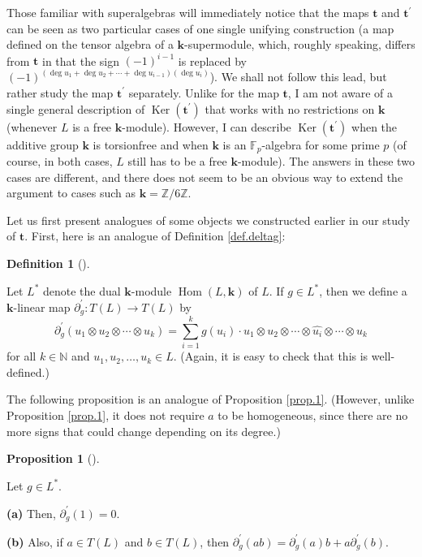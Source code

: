 \documentclass[numbers=enddot,12pt,final,onecolumn,notitlepage]{scrartcl}%
\theoremstyle{definition}
\newtheorem{prop}[theo]{Proposition}
\newenvironment{proposition}[1][]
{\begin{prop}[#1]\begin{leftbar}}
{\end{leftbar}\end{prop}}
\newtheorem{defi}[theo]{Definition}
\newenvironment{definition}[1][]
{\begin{defi}[#1]\begin{leftbar}}
{\end{leftbar}\end{defi}}
\let\sumnonlimits\sum
\renewcommand{\sum}{\sumnonlimits\limits}
\begin{document}
Those familiar with superalgebras will immediately notice that the maps
$\mathbf{t}$ and $\mathbf{t}^{\prime}$ can be seen as two particular cases of
one single unifying construction (a map defined on the tensor algebra of a
$\mathbf{k}$-supermodule, which, roughly speaking, differs from $\mathbf{t}$
in that the sign $\left(  -1\right)  ^{i-1}$ is replaced by $\left(
-1\right)  ^{\left(  \deg u_{1}+\deg u_{2}+\cdots+\deg u_{i-1}\right)  \left(
\deg u_{i}\right)  }$). We shall not follow this lead, but rather study the
map $\mathbf{t}^{\prime}$ separately. Unlike for the map $\mathbf{t}$, I am
not aware of a single general description of $\operatorname*{Ker}\left(
\mathbf{t}^{\prime}\right)  $ that works with no restrictions on $\mathbf{k}$
(whenever $L$ is a free $\mathbf{k}$-module). However, I can describe
$\operatorname*{Ker}\left(  \mathbf{t}^{\prime}\right)  $ when the additive
group $\mathbf{k}$ is torsionfree and when $\mathbf{k}$ is an $\mathbb{F}_{p}%
$-algebra for some prime $p$ (of course, in both cases, $L$ still has to be a
free $\mathbf{k}$-module). The answers in these two cases are different, and
there does not seem to be an obvious way to extend the argument to cases such
as $\mathbf{k}=\mathbb{Z}/6\mathbb{Z}$.

Let us first present analogues of some objects we constructed earlier in our
study of $\mathbf{t}$. First, here is an analogue of Definition
\ref{def.deltag}:

\begin{definition}
Let $L^{\ast}$ denote the dual $\mathbf{k}$-module $\operatorname*{Hom}\left(
L,\mathbf{k}\right)  $ of $L$. If $g\in L^{\ast}$, then we define a
$\mathbf{k}$-linear map $\partial_{g}^{\prime}:T\left(  L\right)  \rightarrow
T\left(  L\right)  $ by%
\[
\partial_{g}^{\prime}\left(  u_{1}\otimes u_{2}\otimes\cdots\otimes
u_{k}\right)  =\sum_{i=1}^{k}g\left(  u_{i}\right)  \cdot u_{1}\otimes
u_{2}\otimes\cdots\otimes\widehat{u_{i}}\otimes\cdots\otimes u_{k}%
\]
for all $k\in\mathbb{N}$ and $u_{1},u_{2},\ldots,u_{k}\in L$. (Again, it is
easy to check that this is well-defined.)
\end{definition}

The following proposition is an analogue of Proposition \ref{prop.1}.
(However, unlike Proposition \ref{prop.1}, it does not require $a$ to be
homogeneous, since there are no more signs that could change depending on its degree.)

\begin{proposition}
\label{prop.1'}Let $g\in L^{\ast}$. \medskip

\textbf{(a)} Then, $\partial_{g}^{\prime}\left(  1\right)  =0$. \medskip

\textbf{(b)} Also, if $a\in T\left(  L\right)  $ and $b\in T\left(  L\right)
$, then $\partial_{g}^{\prime}\left(  ab\right)  =\partial_{g}^{\prime}\left(
a\right)  b+a\partial_{g}^{\prime}\left(  b\right)  $.
\end{proposition}
\end{document}
